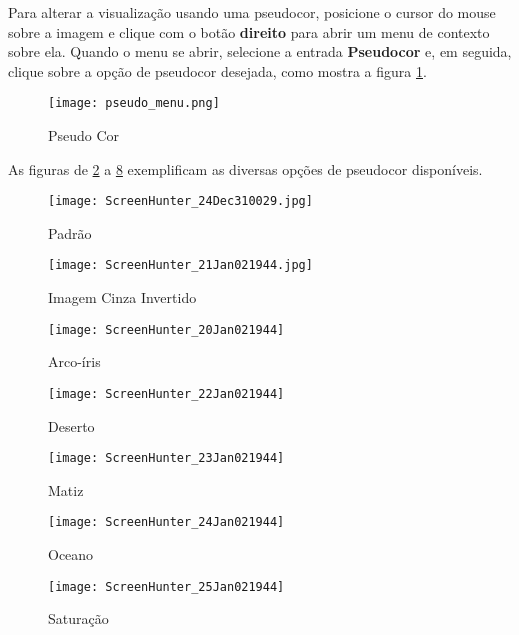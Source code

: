 Para alterar a visualização usando uma pseudocor, posicione o cursor do mouse sobre a imagem e clique
com o botão \textbf{direito} para abrir um menu de contexto sobre ela. Quando o menu se abrir,
selecione a entrada \textbf{Pseudocor} e, em seguida, clique sobre a opção de pseudocor desejada, como
mostra a figura \ref{fig:pseudo_color}.

\begin{figure}[H]
\centering
\texttt{[image: pseudo\_menu.png]}
\caption{Pseudo Cor}
\label{fig:pseudo_color}
\end{figure}

As figuras de \ref{fig:image_default} a \ref{fig:image_saturation} exemplificam as diversas opções de
pseudocor disponíveis.\\

\begin{figure}[H]
\centering
\texttt{[image: ScreenHunter\_24Dec310029.jpg]}
\caption{Padrão}
\label{fig:image_default}
\end{figure}

\begin{figure}[H]
\centering
\texttt{[image: ScreenHunter\_21Jan021944.jpg]}
\caption{Imagem Cinza Invertido}
\label{fig:image_inverted}
\end{figure}

\begin{figure}[H]
\centering
\texttt{[image: ScreenHunter\_20Jan021944]}
\caption{Arco-íris}
\label{fig:image_arc}
\end{figure}

\begin{figure}[H]
\centering
\texttt{[image: ScreenHunter\_22Jan021944]}
\caption{Deserto}
\label{fig:image_desert}
\end{figure}

\begin{figure}[H]
\centering
\texttt{[image: ScreenHunter\_23Jan021944]}
\caption{Matiz}
\label{fig:image_matiz}
\end{figure}

\begin{figure}[H]
\centering
\texttt{[image: ScreenHunter\_24Jan021944]}
\caption{Oceano}
\label{fig:image_ocean}
\end{figure}

\begin{figure}[H]
\centering
\texttt{[image: ScreenHunter\_25Jan021944]}
\caption{Saturação}
\label{fig:image_saturation}
\end{figure}

